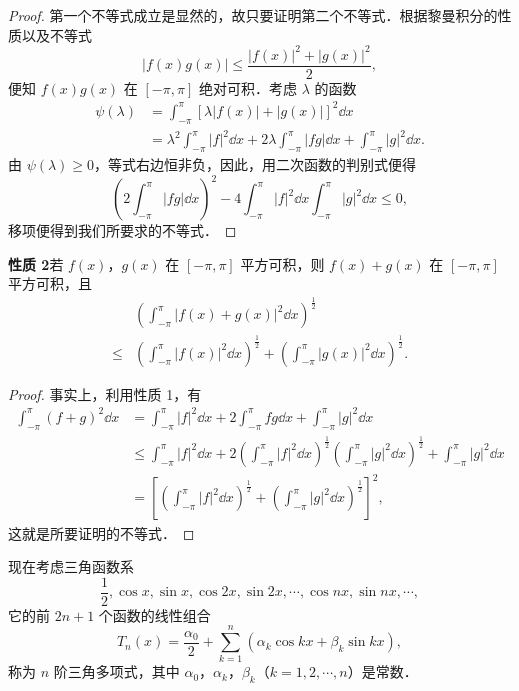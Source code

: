 \begin{proof}
第一个不等式成立是显然的，故只要证明第二个不等式．根据黎曼积分的性质以及不等式
\[
\left|f(x)g(x)\right|\leqslant\frac{\left|f(x)\right|^{2}+\left|g(x)\right|^{2}}{2},
\]
便知 $f(x)g(x)$ 在 $[-\pi,\pi]$ 绝对可积．考虑 $\lambda$ 的函数
\[
\begin{aligned}
\psi(\lambda)&=\int_{-\pi}^{\pi}\left[\lambda\left|f(x)\right|+\left|g(x)\right|\right]^{2}\dd x\\
&=\lambda^{2}\int_{-\pi}^{\pi}\left|f\right|^{2}\dd x+2\lambda\int_{-\pi}^{\pi}\left|fg\right|\dd x+\int_{-\pi}^{\pi}\left|g\right|^{2}\dd x.
\end{aligned}
\]
由 $\psi(\lambda)\geqslant 0$，等式右边恒非负，因此，用二次函数的判别式便得
\[
\left(2\int_{-\pi}^{\pi}\left|fg\right|\dd x\right)^{2}-4\int_{-\pi}^{\pi}\left|f\right|^{2}\dd x\int_{-\pi}^{\pi}\left|g\right|^{2}\dd x\leqslant 0,
\]
移项便得到我们所要求的不等式．
\end{proof}

\textbf{性质 2}\quad 若 $f(x)$，$g(x)$ 在 $[-\pi,\pi]$ 平方可积，则 $f(x)+g(x)$ 在 $[-\pi,\pi]$ 平方可积，且
\[
\begin{aligned}
&\left(\int_{-\pi}^{\pi}\left|f(x)+g(x)\right|^{2}\dd x\right)^{\frac{1}{2}}\\
\leqslant{}&\left(\int_{-\pi}^{\pi}\left|f(x)\right|^{2}\dd x\right)^{\frac{1}{2}}+\left(\int_{-\pi}^{\pi}\left|g(x)\right|^{2}\dd x\right)^{\frac{1}{2}}.
\end{aligned}
\]

\begin{proof}
事实上，利用性质 1，有
\[
\begin{aligned}
\int_{-\pi}^{\pi}(f+g)^{2}\dd x&=\int_{-\pi}^{\pi}\left|f\right|^{2}\dd x+2\int_{-\pi}^{\pi}fg\dd x+\int_{-\pi}^{\pi}\left|g\right|^{2}\dd x\\
&\leqslant\int_{-\pi}^{\pi}\left|f\right|^{2}\dd x+2\left(\int_{-\pi}^{\pi}\left|f\right|^{2}\dd x\right)^{\frac{1}{2}}\left(\int_{-\pi}^{\pi}\left|g\right|^{2}\dd x\right)^{\frac{1}{2}}+\int_{-\pi}^{\pi}\left|g\right|^{2}\dd x\\
&=\left[\left(\int_{-\pi}^{\pi}\left|f\right|^{2}\dd x\right)^{\frac{1}{2}}+\left(\int_{-\pi}^{\pi}\left|g\right|^{2}\dd x\right)^{\frac{1}{2}}\right]^{2},
\end{aligned}
\]
这就是所要证明的不等式．
\end{proof}

现在考虑三角函数系
\[
\frac{1}{2},\cos x,\sin x,\cos 2x,\sin 2x,\cdots,\cos nx,\sin nx,\cdots,
\]
它的前 $2n+1$ 个函数的线性组合
\[
T_{n}(x)=\frac{\alpha_{0}}{2}+\sum_{k=1}^{n}\left(\alpha_{k}\cos kx+\beta_{k}\sin kx\right),
\]
称为 $n$ 阶三角多项式，其中 $\alpha_{0}$，$\alpha_{k}$，$\beta_{k}$（$k=1,2,\cdots,n$）是常数．

